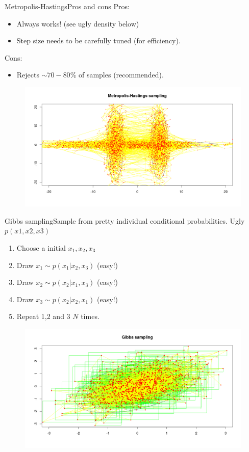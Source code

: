 \documentclass{beamer}
\begin{document}
\begin{frame}{Metropolis-Hastings}{Pros and cons}
	Pros:
	\begin{itemize}
		\item Always works! (see ugly density below)
		\item Step size needs to be carefully tuned (for efficiency).
	\end{itemize}
	Cons:
	\begin{itemize}
		\item Rejects $\sim 70-80$\% of samples (recommended).
	\end{itemize}
	\begin{figure}
		\centering
		\includegraphics[width=\textwidth]{metropolis_bidimensional.png}
	\end{figure}
\end{frame}

\begin{frame}{Gibbs sampling}{Sample from pretty individual conditional probabilities.}
	Ugly $p(x1, x2, x3)$
	\begin{enumerate}
		\item Choose a initial $x_1, x_2, x_3$
		\item Draw $x_1 \sim p(x_1 | x_2, x_3)$ (easy!)
		\item Draw $x_2 \sim p(x_2 | x_1, x_3)$ (easy!)
		\item Draw $x_3 \sim p(x_2 | x_2, x_1)$ (easy!)
		\item Repeat 1,2 and 3 $N$ times.
	\end{enumerate}
		\begin{figure}
			\centering
			\includegraphics[width=\textwidth]{gibbs.png}
		\end{figure}
\end{frame}
\end{document}
